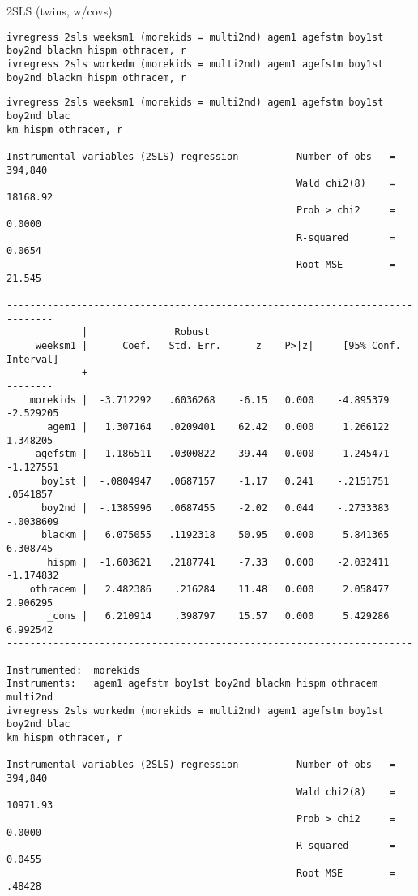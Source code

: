 \documentclass[11pt]{article}
\begin{document}
2SLS (twins, w/covs)
\begin{verbatim}
ivregress 2sls weeksm1 (morekids = multi2nd) agem1 agefstm boy1st boy2nd blackm hispm othracem, r
ivregress 2sls workedm (morekids = multi2nd) agem1 agefstm boy1st boy2nd blackm hispm othracem, r
\end{verbatim}

\begin{verbatim}
ivregress 2sls weeksm1 (morekids = multi2nd) agem1 agefstm boy1st boy2nd blac
km hispm othracem, r

Instrumental variables (2SLS) regression          Number of obs   =    394,840
                                                  Wald chi2(8)    =   18168.92
                                                  Prob > chi2     =     0.0000
                                                  R-squared       =     0.0654
                                                  Root MSE        =     21.545

------------------------------------------------------------------------------
             |               Robust
     weeksm1 |      Coef.   Std. Err.      z    P>|z|     [95% Conf. Interval]
-------------+----------------------------------------------------------------
    morekids |  -3.712292   .6036268    -6.15   0.000    -4.895379   -2.529205
       agem1 |   1.307164   .0209401    62.42   0.000     1.266122    1.348205
     agefstm |  -1.186511   .0300822   -39.44   0.000    -1.245471   -1.127551
      boy1st |  -.0804947   .0687157    -1.17   0.241    -.2151751    .0541857
      boy2nd |  -.1385996   .0687455    -2.02   0.044    -.2733383   -.0038609
      blackm |   6.075055   .1192318    50.95   0.000     5.841365    6.308745
       hispm |  -1.603621   .2187741    -7.33   0.000    -2.032411   -1.174832
    othracem |   2.482386    .216284    11.48   0.000     2.058477    2.906295
       _cons |   6.210914    .398797    15.57   0.000     5.429286    6.992542
------------------------------------------------------------------------------
Instrumented:  morekids
Instruments:   agem1 agefstm boy1st boy2nd blackm hispm othracem multi2nd
ivregress 2sls workedm (morekids = multi2nd) agem1 agefstm boy1st boy2nd blac
km hispm othracem, r

Instrumental variables (2SLS) regression          Number of obs   =    394,840
                                                  Wald chi2(8)    =   10971.93
                                                  Prob > chi2     =     0.0000
                                                  R-squared       =     0.0455
                                                  Root MSE        =     .48428


\end{verbatim}
\end{document}
